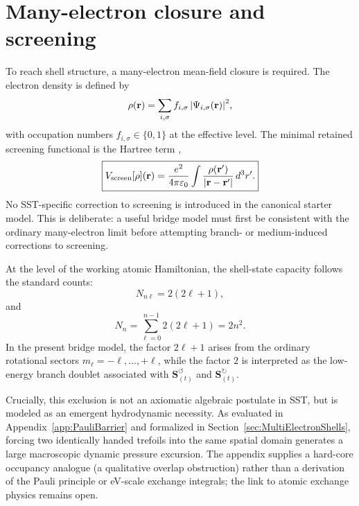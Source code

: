 \documentclass[11pt,a4paper]{article}
\begin{document}
    \section{Many-electron closure and screening}
    \label{sec:many-electron}
    To reach shell structure, a many-electron mean-field closure is required. The electron density is defined by
    \begin{equation}
        \label{eq:rho-def}
        \rho(\mathbf r)=\sum_{i,\sigma} f_{i,\sigma}\,\abs{\Psi_{i,\sigma}(\mathbf r)}^2,
    \end{equation}
    with occupation numbers $f_{i,\sigma}\in\{0,1\}$ at the effective level. The minimal retained screening functional is the Hartree term \cite{Hartree1928},
    \begin{equation}
        \label{eq:Vscreen}
        \boxed{
            V_{\rm screen}[\rho](\mathbf r)
            =
            \frac{e^2}{4\pi\varepsilon_0}
            \int \frac{\rho(\mathbf r')}{\abs{\mathbf r-\mathbf r'}}\,d^3r'.
        }
    \end{equation}
    No SST-specific correction to screening is introduced in the canonical starter model. This is deliberate: a useful bridge model must first be consistent with the ordinary many-electron limit before attempting branch- or medium-induced corrections to screening.
    
    At the level of the working atomic Hamiltonian, the shell-state capacity follows the standard counts:
    \begin{equation}
        \label{eq:subshell-count}
        N_{n\ell}=2(2\ell+1),
    \end{equation}
    and
    \begin{equation}
        \label{eq:shell-count}
        N_n=\sum_{\ell=0}^{n-1}2(2\ell+1)=2n^2.
    \end{equation}
    In the present bridge model, the factor $2\ell+1$ arises from the ordinary rotational sectors $m_\ell=-\ell,\ldots,+\ell$, while the factor $2$ is interpreted as the low-energy branch doublet associated with $\mathbf{S}_{(t)}^{\!\boldsymbol{\circlearrowleft}}$ and $\mathbf{S}_{(t)}^{\!\boldsymbol{\circlearrowright}}$.
    
    Crucially, this exclusion is not an axiomatic algebraic postulate in SST, but is modeled as an emergent hydrodynamic necessity. As evaluated in Appendix~\ref{app:PauliBarrier} and formalized in Section~\ref{sec:MultiElectronShells}, forcing two identically handed trefoils into the same spatial domain generates a large macroscopic dynamic pressure excursion. The appendix supplies a hard-core occupancy analogue (a qualitative overlap obstruction) rather than a derivation of the Pauli principle or eV-scale exchange integrals; the link to atomic exchange physics remains open.
    
\end{document}
